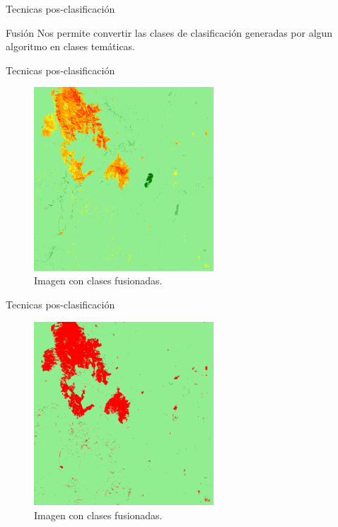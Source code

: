 \documentclass[handout]{beamer}
\begin{document}
\begin{frame}{Tecnicas pos-clasificación}
  \begin{block}{Fusión}
    Nos permite convertir las clases de clasificación generadas por algun algoritmo en clases temáticas.
  \end{block}
\end{frame}

\begin{frame}{Tecnicas pos-clasificación}
  \begin{figure}
    \includegraphics[width=0.6\textwidth]{imagenes/im_class.png}
    \caption{Imagen con clases fusionadas.}
  \end{figure}
\end{frame}

\begin{frame}{Tecnicas pos-clasificación}
  \begin{figure}
    \includegraphics[width=0.6\textwidth]{imagenes/im_fus.png}
    \caption{Imagen con clases fusionadas.}
  \end{figure}
\end{frame}
\end{document}

